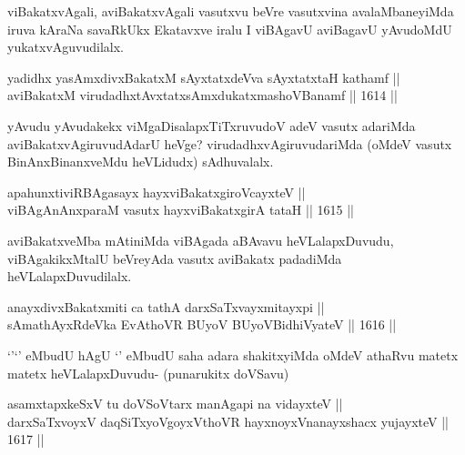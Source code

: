 \begin{artha}
viBakatxvAgali, aviBakatxvAgali vasutxvu beVre vasutxvina avalaMbaneyiMda iruva kAraNa savaRkUkx Ekatavxve iralu I viBAgavU aviBagavU yAvudoMdU yukatxvAguvudilalx.
\end{artha}

\begin{shl}
yadidhx yasAmxdivxBakatxM sAyxtatxdeVva sAyxtatxtaH kathamf || \\
aviBakatxM virudadhxtAvxtatxsAmxdukatxmashoVBanamf \hfill || 1614 ||  
\end{shl}

\begin{artha}
yAvudu yAvudakekx viMgaDisalapxTiTxruvudoV adeV vasutx adariMda aviBakatxvAgiruvudAdarU heVge? virudadhxvAgiruvudariMda (oMdeV vasutx BinAnxBinanxveMdu heVLidudx) sAdhuvalalx.
\end{artha}

\begin{shl}
apahunxtiviRBAgasayx hayxviBakatxgiroVcayxteV ||  \\
viBAgAnAnxparaM vasutx hayxviBakatxgirA tataH \hfill || 1615 ||  
\end{shl}

\begin{artha}
aviBakatxveMba mAtiniMda viBAgada aBAvavu heVLalapxDuvudu, viBAgakikxMtalU beVreyAda vasutx aviBakatx padadiMda heVLalapxDuvudilalx.
\end{artha}


\begin{shl}
anayxdivxBakatxmiti ca tathA darxSaTxvayxmitayxpi || \\
sAmathAyxRdeVka EvAthoVR BUyoV BUyoV\s BidhiVyateV \hfill || 1616 ||  
\end{shl}

\begin{artha}
`\stext'`\stext' eMbudU hAgU `\stext' eMbudU saha adara shakitxyiMda oMdeV athaRvu matetx matetx heVLalapxDuvudu- (punarukitx doVSavu)
\end{artha}


\begin{shl}
asamxtapxkeSxV tu doVSoV\s tarx manAgapi na vidayxteV || \\
darxSaTxvoyxV daqSiTxyoVgoyxV\s thoVR hayxnoyxV\s nanayxshacx yujayxteV \hfill || 1617 ||  
\end{shl}

